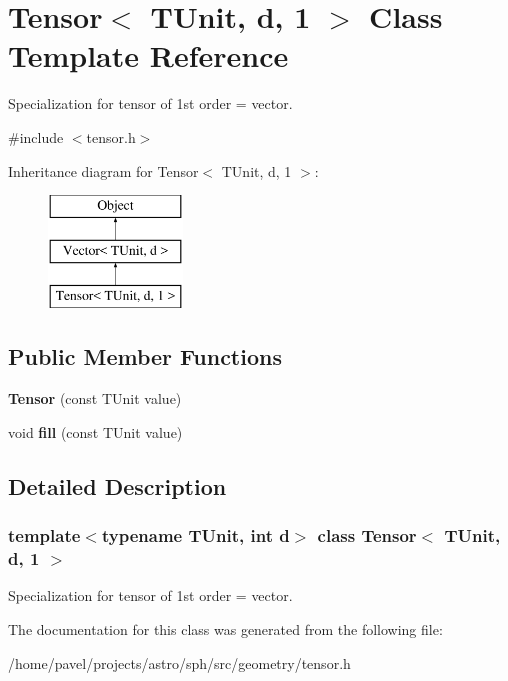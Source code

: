 \hypertarget{classTensor_3_01TUnit_00_01d_00_011_01_4}{}\section{Tensor$<$ T\+Unit, d, 1 $>$ Class Template Reference}
\label{classTensor_3_01TUnit_00_01d_00_011_01_4}


Specialization for tensor of 1st order = vector.  




{\ttfamily \#include $<$tensor.\+h$>$}

Inheritance diagram for Tensor$<$ T\+Unit, d, 1 $>$\+:\begin{figure}[H]
\begin{center}
\leavevmode
\includegraphics[height=3.000000cm]{classTensor_3_01TUnit_00_01d_00_011_01_4}
\end{center}
\end{figure}
\subsection*{Public Member Functions}
\begin{DoxyCompactItemize}
\item 
\hypertarget{classTensor_3_01TUnit_00_01d_00_011_01_4_abc6dab1c2e7bbdd262fb00a918840680}{}\label{classTensor_3_01TUnit_00_01d_00_011_01_4_abc6dab1c2e7bbdd262fb00a918840680} 
{\bfseries Tensor} (const T\+Unit value)
\item 
\hypertarget{classTensor_3_01TUnit_00_01d_00_011_01_4_a8e5becf61618129d281e19b991234493}{}\label{classTensor_3_01TUnit_00_01d_00_011_01_4_a8e5becf61618129d281e19b991234493} 
void {\bfseries fill} (const T\+Unit value)
\end{DoxyCompactItemize}


\subsection{Detailed Description}
\subsubsection*{template$<$typename T\+Unit, int d$>$\newline
class Tensor$<$ T\+Unit, d, 1 $>$}

Specialization for tensor of 1st order = vector. 

The documentation for this class was generated from the following file\+:\begin{DoxyCompactItemize}
\item 
/home/pavel/projects/astro/sph/src/geometry/tensor.\+h\end{DoxyCompactItemize}
